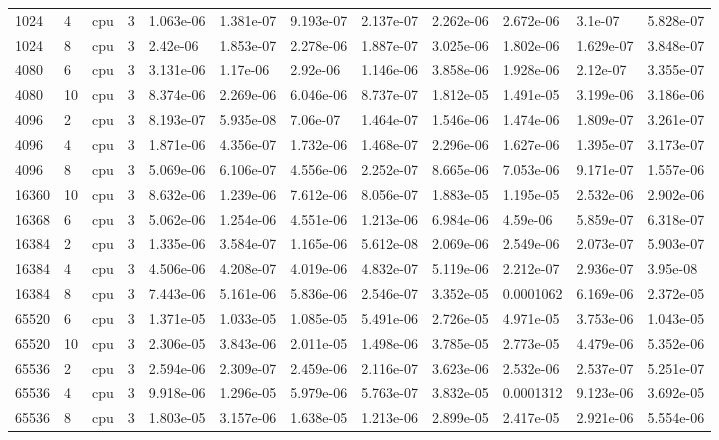 \begin{tabular}{llllllllllll}
1024 & 4 & cpu & 3 & 1.063e-06 & 1.381e-07 & 9.193e-07 & 2.137e-07 & 2.262e-06 & 2.672e-06 & 3.1e-07 & 5.828e-07 \\
1024 & 8 & cpu & 3 & 2.42e-06 & 1.853e-07 & 2.278e-06 & 1.887e-07 & 3.025e-06 & 1.802e-06 & 1.629e-07 & 3.848e-07 \\
4080 & 6 & cpu & 3 & 3.131e-06 & 1.17e-06 & 2.92e-06 & 1.146e-06 & 3.858e-06 & 1.928e-06 & 2.12e-07 & 3.355e-07 \\
4080 & 10 & cpu & 3 & 8.374e-06 & 2.269e-06 & 6.046e-06 & 8.737e-07 & 1.812e-05 & 1.491e-05 & 3.199e-06 & 3.186e-06 \\
4096 & 2 & cpu & 3 & 8.193e-07 & 5.935e-08 & 7.06e-07 & 1.464e-07 & 1.546e-06 & 1.474e-06 & 1.809e-07 & 3.261e-07 \\
4096 & 4 & cpu & 3 & 1.871e-06 & 4.356e-07 & 1.732e-06 & 1.468e-07 & 2.296e-06 & 1.627e-06 & 1.395e-07 & 3.173e-07 \\
4096 & 8 & cpu & 3 & 5.069e-06 & 6.106e-07 & 4.556e-06 & 2.252e-07 & 8.665e-06 & 7.053e-06 & 9.171e-07 & 1.557e-06 \\
16360 & 10 & cpu & 3 & 8.632e-06 & 1.239e-06 & 7.612e-06 & 8.056e-07 & 1.883e-05 & 1.195e-05 & 2.532e-06 & 2.902e-06 \\
16368 & 6 & cpu & 3 & 5.062e-06 & 1.254e-06 & 4.551e-06 & 1.213e-06 & 6.984e-06 & 4.59e-06 & 5.859e-07 & 6.318e-07 \\
16384 & 2 & cpu & 3 & 1.335e-06 & 3.584e-07 & 1.165e-06 & 5.612e-08 & 2.069e-06 & 2.549e-06 & 2.073e-07 & 5.903e-07 \\
16384 & 4 & cpu & 3 & 4.506e-06 & 4.208e-07 & 4.019e-06 & 4.832e-07 & 5.119e-06 & 2.212e-07 & 2.936e-07 & 3.95e-08 \\
16384 & 8 & cpu & 3 & 7.443e-06 & 5.161e-06 & 5.836e-06 & 2.546e-07 & 3.352e-05 & 0.0001062 & 6.169e-06 & 2.372e-05 \\
65520 & 6 & cpu & 3 & 1.371e-05 & 1.033e-05 & 1.085e-05 & 5.491e-06 & 2.726e-05 & 4.971e-05 & 3.753e-06 & 1.043e-05 \\
65520 & 10 & cpu & 3 & 2.306e-05 & 3.843e-06 & 2.011e-05 & 1.498e-06 & 3.785e-05 & 2.773e-05 & 4.479e-06 & 5.352e-06 \\
65536 & 2 & cpu & 3 & 2.594e-06 & 2.309e-07 & 2.459e-06 & 2.116e-07 & 3.623e-06 & 2.532e-06 & 2.537e-07 & 5.251e-07 \\
65536 & 4 & cpu & 3 & 9.918e-06 & 1.296e-05 & 5.979e-06 & 5.763e-07 & 3.832e-05 & 0.0001312 & 9.123e-06 & 3.692e-05 \\
65536 & 8 & cpu & 3 & 1.803e-05 & 3.157e-06 & 1.638e-05 & 1.213e-06 & 2.899e-05 & 2.417e-05 & 2.921e-06 & 5.554e-06 \\

\end{tabular}
